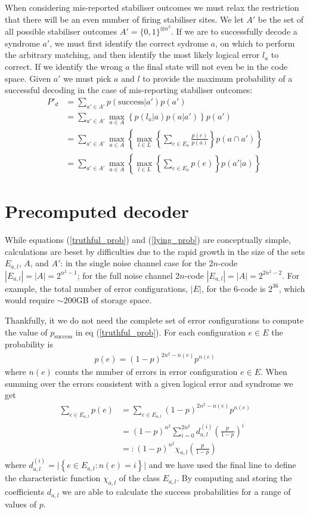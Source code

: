 When considering mis-reported stabiliser outcomes we must relax the restriction that there will be an even number of firing stabiliser sites. We let $A'$ be the set of all possible stabiliser outcomes $A' = \{0, 1\}^{\otimes n^2}$. If we are to successfully decode a syndrome $a'$, we must first identify the correct sydrome $a$, on which to perform the arbitrary matching, and then identify the most likely logical error $l_a$ to correct. If we identify the wrong $a$ the final state will not even be in the code space. Given $a'$ we must pick $a$ and $l$ to provide the maximum probability of a successful decoding in the case of mis-reporting stabiliser outcomes:
\begin{align}
  P'_d &= \sum_{a' \in A'} p(\text{success} \vert a') p(a') \\
  &= \sum_{a'\in A'} \max_{a \in A} \left\{ p(l_a \vert a) p(a \vert a') \right\} p(a')\\
  &= \sum_{a'\in A'} \max_{a \in A} \left\{ \max_{l \in L} \left\{\sum_{e \in E_a} \frac{p(e)}{p(a)} \right\} p(a \cap a') \right\}\\
  &= \sum_{a'\in A'} \max_{a \in A} \left\{ \max_{l \in L} \left\{\sum_{e \in E_a} p(e) \right\} p(a' \vert a) \right\} \label{lying_prob}
\end{align}

\section{Precomputed decoder}

While equations (\ref{truthful_prob}) and (\ref{lying_prob}) are conceptually simple, calculations are beset by difficulties due to the rapid growth in the size of the sets $E_{a,l}$, $A$, and $A'$: in the single noise channel case for the $2n$-code $|E_{a,l}| = |A| = 2^{n^2-1}$; for the full noise channel $2n$-code $|E_{a,l}| = |A| = 2^{2n^2 - 2}$. For example, the total number of error configurations, $|E|$, for the $6$-code is $2^{36}$, which would require $\sim200$GB of storage space.

Thankfully, it we do not need the complete set of error configurations to compute the value of $p_\text{success}$ in eq (\ref{truthful_prob}). For each configuration $e\in E$ the probability is
\begin{align}
  p(e) = (1-p)^{2n^2 - n(e)} p^{n(e)}
\end{align}
where $n(e)$ counts the number of errors in error configuration $e \in E$. When summing over the errors consistent with a given logical error and syndrome we get
\begin{align}
  \sum_{e \in E_{a,l}} p(e) &= \sum_{e \in E_{a,l}} (1-p)^{2n^2 - n(e)} p^{n(e)} \\
  &= (1-p)^{n^2} \sum_{i = 0}^{2n^2} d_{a,l}^{(i)} \left(\frac{p}{1-p}\right)^i \\
  &=: (1-p)^{n^2} \chi_{a,l}\left(\frac{p}{1-p}\right)
\end{align}
where $d_{a,l}^{(i)} = \vert \left\{e \in E_{a,l} : n(e)=i \right\} \vert$ and we have used the final line to define the characteristic function $\chi_{a,l}$ of the class $E_{a,l}$. By computing and storing the coefficients $d_{a,l}$ we are able to calculate the success probabilities for a range of values of $p$.

